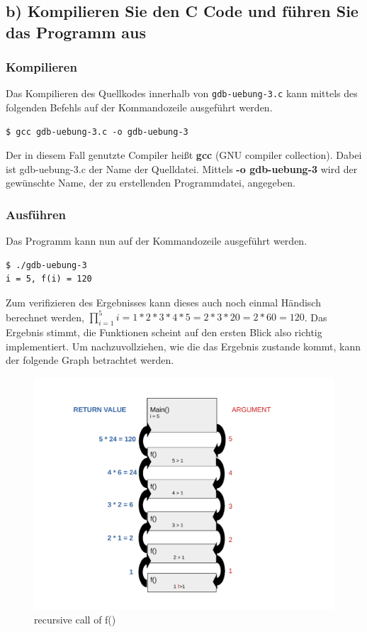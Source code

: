 \documentclass[12pt]{article}
\begin{document}
{\subsection{b) Kompilieren Sie den C Code und führen Sie das Programm aus }
\subsubsection{Kompilieren}
Das Kompilieren des Quellkodes innerhalb von \texttt{gdb-uebung-3.c} kann mittels des folgenden Befehls auf der Kommandozeile ausgeführt werden.
\begin{lstlisting}
$ gcc gdb-uebung-3.c -o gdb-uebung-3
\end{lstlisting}
Der in diesem Fall genutzte Compiler heißt \textbf{gcc} (GNU compiler collection). Dabei ist gdb-uebung-3.c der Name der Quelldatei. Mittels \textbf{-o gdb-uebung-3} wird der gewünschte Name, der zu erstellenden Programmdatei, angegeben.

\subsubsection{Ausführen}
Das Programm kann nun auf der Kommandozeile ausgeführt werden.
\begin{lstlisting}
$ ./gdb-uebung-3                    
i = 5, f(i) = 120
\end{lstlisting}
Zum verifizieren des Ergebnisses kann dieses auch noch einmal Händisch berechnet werden, $ \prod_{i = 1}^{5} i = 1 * 2 * 3 * 4 * 5 = 2 * 3 * 20 = 2 * 60 = 120 $. Das Ergebnis stimmt, die Funktionen scheint auf den ersten Blick also richtig implementiert. Um nachzuvollziehen, wie die das Ergebnis zustande kommt, kann der folgende Graph betrachtet werden.

\begin{center}
\begin{figure}[h]
	\includegraphics[scale=0.6]{Pictures/aufgabe3aufrufe.pdf}
	\caption{recursive call of f()}
	\label{fig:recursive2}
\end{figure}
\end{center}

}
\end{document}
